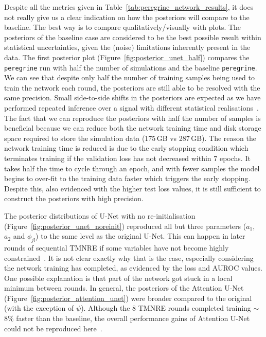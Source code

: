 Despite all the metrics given in Table~\ref{tab:peregrine_network_results}, it does not really give us a clear indication on how the posteriors will compare to the baseline. The best way is to compare qualitatively/visually with plots. The posteriors of the baseline case are considered to be the best possible result within statistical uncertainties, given the (noise) limitations inherently present in the data. The first posterior plot (Figure~\ref{fig:posterior_unet_half}) compares the \texttt{peregrine} run with half the number of simulations and the baseline \texttt{peregrine}. We can see that despite only half the number of training samples being used to train the network each round, the posteriors are still able to be resolved with the same precision. Small side-to-side shifts in the posteriors are expected as we have performed repeated inference over a signal with different statistical realisations~\cite{bhardwaj2023peregrine}. The fact that we can reproduce the posteriors with half the number of samples is beneficial because we can reduce both the network training time and disk storage space required to store the simulation data (175\,GB vs 287\,GB). The reason the network training time is reduced is due to the early stopping condition which terminates training if the validation loss has not decreased within 7 epochs. It takes half the time to cycle through an epoch, and with fewer samples the model begins to over-fit to the training data faster which triggers the early stopping. Despite this, also evidenced with the higher test loss values, it is still sufficient to construct the posteriors with high precision.

The posterior distributions of U-Net with no re-initialisation (Figure~\ref{fig:posterior_unet_noreinit})  reproduced all but three parameters ($a_1$, $a_2$ and $\phi_{jl}$) to the same level as the original U-Net. This can happen in later rounds of sequential TMNRE if some variables have not become highly constrained~\cite{Karchev_Trotta_Weniger_2023}. It is not clear exactly why that is the case, especially considering the network training has completed, as evidenced by the loss and AUROC values. One possible explanation is that part of the network got stuck in a local minimum between rounds. %
In general, the posteriors of the Attention U-Net (Figure~\ref{fig:posterior_attention_unet}) were broader compared to the original (with the exception of $\psi$). Although the 8 TMNRE rounds completed training $\sim$8\% faster than the baseline, the overall performance gains of Attention U-Net could not be reproduced here~\cite{Oktay_2018_AUNet}.

